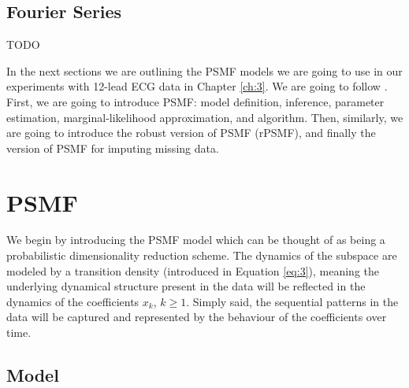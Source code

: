 \documentclass{mldsmsc}
\begin{document}
\subsection{Fourier Series}

TODO \newline

\noindent In the next sections we are outlining the PSMF models we are going to use in our experiments with 12-lead ECG data in Chapter \ref{ch:3}. We are going to follow \cite{akyildiz2021probabilistic}. First, we are going to introduce PSMF: model definition, inference, parameter estimation, marginal-likelihood approximation, and algorithm. Then, similarly, we are going to introduce the robust version of PSMF (rPSMF), and finally the version of PSMF for imputing missing data.

\section{PSMF}

We begin by introducing the PSMF model which can be thought of as being a probabilistic dimensionality reduction scheme. The dynamics of the subspace are modeled by a transition density (introduced in Equation \ref{eq:3}), meaning the underlying dynamical structure present in the data will be reflected in the dynamics of the coefficients $x_k$, $k \geq 1$. Simply said, the sequential patterns in the data will be captured and represented by the behaviour of the coefficients over time.

\subsection{Model}
\end{document}
